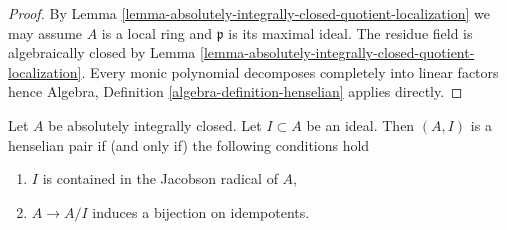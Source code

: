 \begin{proof}
By Lemma \ref{lemma-absolutely-integrally-closed-quotient-localization}
we may assume $A$ is a local ring and $\mathfrak p$ is its maximal ideal.
The residue field is algebraically closed by
Lemma \ref{lemma-absolutely-integrally-closed-quotient-localization}.
Every monic polynomial decomposes completely into linear factors
hence Algebra, Definition \ref{algebra-definition-henselian} applies directly.
\end{proof}

\begin{lemma}
\label{lemma-absolutely-integrally-closed-henselian-pair}
Let $A$ be absolutely integrally closed. Let $I \subset A$ be an ideal.
Then $(A, I)$ is a henselian pair if (and only if) the following
conditions hold
\begin{enumerate}
\item $I$ is contained in the Jacobson radical of $A$,
\item $A \to A/I$ induces a bijection on idempotents.
\end{enumerate}
\end{lemma}

